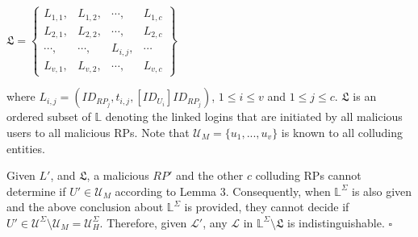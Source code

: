 {\centering $\mathfrak{L}=\left \{ \begin{matrix} L_{1,1},&L_{1,2},&\cdots,&L_{1,c} \\
L_{2,1},& L_{2,2},&\cdots,&L_{2,c}  \\
\cdots,&\cdots,&L_{i,j},&\cdots  \\
L_{v,1},&L_{v,2},&\cdots,&L_{v,c}
\end{matrix}\right\}$
\par}

\noindent where $L_{i,j} = (ID_{RP_j}, t_{i,j}, [ID_{U_i}]ID_{RP_j})$, $1 \leq i \leq v$ and $1 \leq j \leq c$.
$\mathfrak{L}$ is an ordered subset of $\mathbb{L}$ denoting the linked logins that are initiated by all malicious users to all malicious RPs. Note that $\mathcal{U}_M=\{u_1,...,u_v\}$ is known to all colluding entities.

Given $L'$, and $\mathfrak{L}$, a malicious $RP'$ and the other $c$ colluding RPs cannot determine if $U' \in \mathcal{U}_M$ according to Lemma 3.
Consequently, when $\mathbb{L}^{\Sigma}$ is also given and the above conclusion about $\mathbb{L}^{\Sigma}$ is provided, they cannot decide if $U' \in \mathcal{U}^{\Sigma} \setminus \mathcal{U}_M = \mathcal{U}^{\Sigma}_H$.
Therefore, given $\mathcal{L}'$,
    any $\mathcal{L}$ in $\mathbb{L}^{\Sigma} \setminus \mathfrak{L}$ is indistinguishable.
 \hfill $\square$






